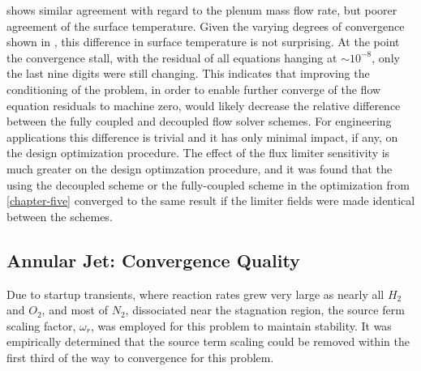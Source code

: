  shows similar agreement with regard to the plenum
mass flow rate, but poorer agreement of the surface temperature. Given the
varying degrees of convergence shown in , this
difference in surface temperature is not surprising. At the point the
convergence stall, with the residual of all equations hanging at $\sim
10^{-8}$, only the last nine digits were still changing.  This indicates that
improving the conditioning of the problem, in order to enable further converge
of the flow equation residuals to machine zero, would likely decrease the relative
difference between the fully coupled and decoupled flow solver schemes.  For
engineering applications this difference is trivial and it has only minimal
impact, if any, on the design optimization procedure.  The effect of the flux
limiter sensitivity is much greater on the design optimzation procedure, and it
was found that the using the decoupled scheme or the fully-coupled scheme in the
optimization from \cref{chapter-five} converged to the same result if the
limiter fields were made identical between the schemes.

\subsection{Annular Jet: Convergence Quality}

Due to startup transients, where reaction rates grew very large as nearly all
$H_2$ and $O_2$, and most of $N_2$, dissociated near the stagnation region, the
source ferm scaling factor, $\omega_r$, was employed for this problem to
maintain stability.  It was empirically determined that the source term scaling
could be removed within the first third of the way to convergence for this
problem.  

